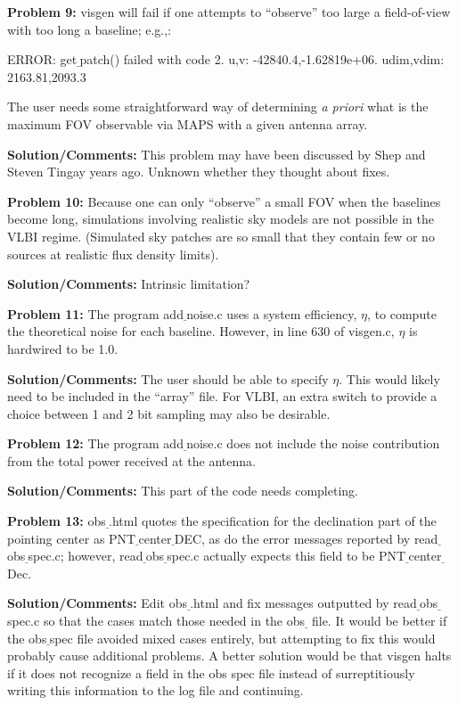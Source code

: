 \documentclass[12pt]{article}
\begin{document}
\begin{flushleft}
{\bf {\color{red}Problem 9:}} {\sf visgen} will fail if one 
attempts to ``observe'' too
large a field-of-view with too long a baseline; e.g.,:

ERROR: get$\underline~$patch() failed with code 2.
u,v: -42840.4,-1.62819e+06. udim,vdim: 2163.81,2093.3

The user needs some straightforward 
way of determining {\it a priori} what is the maximum FOV 
observable via MAPS with a given
antenna array.

{\bf Solution/Comments:} This problem may have been discussed by Shep
and Steven Tingay years ago. Unknown whether they thought about fixes.

\bigskip

{\bf {\color{red}Problem 10:}} Because one can only ``observe'' a small FOV when the baselines
become long, simulations involving realistic sky models are not
possible in the VLBI regime. (Simulated sky patches are so small
that they contain few or no sources at realistic flux density limits).

{\bf Solution/Comments:} Intrinsic limitation?


\bigskip

{\bf {\color{red}Problem 11:}} The program add$\underline~$noise.c
uses a system efficiency, $\eta$, to compute the theoretical noise for
each baseline. However, in line 630 of visgen.c, $\eta$ is hardwired to
be 1.0. 

{\bf Solution/Comments:} The user should be able to specify
$\eta$. This would likely need to be included in the ``array'' file. For VLBI, 
an extra switch to provide a choice between 1 and 2 bit sampling may 
also be desirable.


\bigskip

{\bf {\color{red}Problem 12:}} The program add$\underline~$noise.c
does not include the noise contribution from the total power received
at the antenna. 

{\bf Solution/Comments:} This part of the code needs completing.


\bigskip

{\bf {\color{red}Problem 13:}} obs$\underline~$.html quotes the
specification for the declination part of the pointing center as
PNT$\underline~$center$\underline~$DEC, as do the error messages
reported by read$\underline~$obs$\underline~$spec.c; however,
read$\underline~$obs$\underline~$spec.c actually expects this field to be 
PNT$\underline~$center$\underline~$Dec.

{\bf Solution/Comments:} Edit obs$\underline~$.html and fix messages
outputted by read$\underline~$obs$\underline~$spec.c so that the cases
match those needed in the obs$\underline~$ file. It would be better if
the obs$\underline~$spec file avoided mixed cases entirely, but
attempting to fix
this would probably cause additional problems. A better solution would
be that {\sf visgen} halts if it does not recognize a field in the obs
spec file instead of surreptitiously 
writing this information to the log file and continuing.


\end{flushleft}
\end{document}
